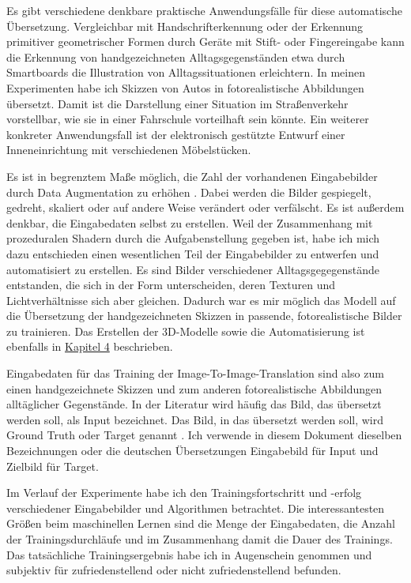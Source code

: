 Es gibt verschiedene denkbare praktische Anwendungsfälle für diese automatische Übersetzung. Vergleichbar mit Handschrifterkennung oder der Erkennung primitiver geometrischer Formen durch Geräte mit Stift- oder Fingereingabe kann die Erkennung von handgezeichneten Alltagsgegenständen etwa durch Smartboards die Illustration von Alltagssituationen erleichtern. In meinen Experimenten habe ich Skizzen von Autos in fotorealistische Abbildungen übersetzt. Damit ist die Darstellung einer Situation im Straßenverkehr vorstellbar, wie sie in einer Fahrschule vorteilhaft sein könnte. Ein weiterer konkreter Anwendungsfall ist der elektronisch gestützte Entwurf einer Inneneinrichtung mit verschiedenen Möbelstücken.

Es ist in begrenztem Maße möglich, die Zahl der vorhandenen Eingabebilder durch Data Augmentation zu erhöhen \cite{chollet2021deep}. Dabei werden die Bilder gespiegelt, gedreht, skaliert oder auf andere Weise verändert oder verfälscht. Es ist außerdem denkbar, die Eingabedaten selbst zu erstellen. Weil der Zusammenhang mit prozeduralen Shadern durch die Aufgabenstellung gegeben ist, habe ich mich dazu entschieden einen wesentlichen Teil der Eingabebilder zu entwerfen und automatisiert zu erstellen. Es sind Bilder verschiedener Alltagsgegegenstände entstanden, die sich in der Form unterscheiden, deren Texturen und Lichtverhältnisse sich aber gleichen. Dadurch war es mir möglich das Modell auf die Übersetzung der handgezeichneten Skizzen in passende, fotorealistische Bilder zu trainieren. Das Erstellen der 3D-Modelle sowie die Automatisierung ist ebenfalls in \hyperref[ch:conduct]{Kapitel 4} beschrieben.

Eingabedaten für das Training der Image-To-Image-Translation sind also zum einen handgezeichnete Skizzen und zum anderen fotorealistische Abbildungen alltäglicher Gegenstände. In der Literatur wird häufig das Bild, das übersetzt werden soll, als Input bezeichnet. Das Bild, in das übersetzt werden soll, wird Ground Truth oder Target genannt \cite{chollet2021deep}. Ich verwende in diesem Dokument dieselben Bezeichnungen oder die deutschen Übersetzungen Eingabebild für Input und Zielbild für Target.

Im Verlauf der Experimente habe ich den Trainingsfortschritt und -erfolg verschiedener Eingabebilder und Algorithmen betrachtet. Die interessantesten Größen beim maschinellen Lernen sind die Menge der Eingabedaten, die Anzahl der Trainingsdurchläufe und im Zusammenhang damit die Dauer des Trainings. Das tatsächliche Trainingsergebnis habe ich in Augenschein genommen und subjektiv für zufriedenstellend oder nicht zufriedenstellend befunden.

